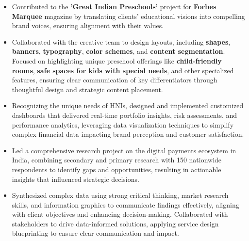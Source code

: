 \documentclass[10pt,a4paper,ragged2e,withhyper]{altacv}
\begin{document}
\begin{paracol}{2}
\divider

\begin{itemize}
  \item Contributed to the \textbf{'Great Indian Preschools'} project for \textbf{Forbes Marquee} magazine by translating clients' educational visions into compelling brand voices, ensuring alignment with their values.  
  \item Collaborated with the creative team to design layouts, including \textbf{shapes}, \textbf{banners}, \textbf{typography}, \textbf{color schemes}, and \textbf{content segmentation}. Focused on highlighting unique preschool offerings like \textbf{child-friendly rooms}, \textbf{safe spaces for kids with special needs}, and other specialized features, ensuring clear communication of key differentiators through thoughtful design and strategic content placement.
\end{itemize}

\divider

\begin{itemize}
  \item Recognizing the unique needs of HNIs, designed and implemented customized dashboards that delivered real-time portfolio insights, risk assessments, and performance analytics, leveraging data visualization techniques to simplify complex financial data impacting brand perception and customer satisfaction.
\end{itemize}


\divider

\begin{itemize}[left=0pt]
  \item Led a comprehensive research project on the digital payments ecosystem in India, combining secondary and primary research with 150 nationwide respondents to identify gaps and opportunities, resulting in actionable insights that influenced strategic decisions.
  \item Synthesized complex data using strong critical thinking, market research skills, and information graphics to communicate findings effectively, aligning with client objectives and enhancing decision-making. Collaborated with stakeholders to drive data-informed solutions, applying service design blueprinting to ensure clear communication and impact.
\end{itemize}


\end{paracol}
\end{document}
